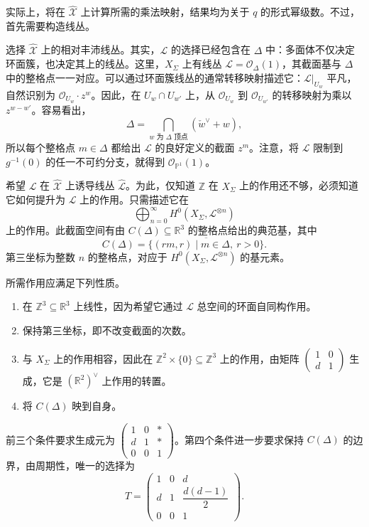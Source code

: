 实际上，将在 $\widehat{\mathcal X}$ 上计算所需的乘法映射，结果均为关于 $q$ 的形式幂级数。不过，首先需要构造线丛。

选择 $\widehat{\mathcal X}$ 上的相对丰沛线丛。其实，$\mathcal L$ 的选择已经包含在 $\Delta$ 中：多面体不仅决定环面簇，也决定其上的线丛。这里，$X_\Sigma$ 上有线丛 $\mathcal L=\mathcal O_\Delta(1)$，其截面基与 $\Delta$ 中的整格点一一对应。可以通过环面簇线丛的通常转移映射描述它：$\mathcal L|_{U_w}$ 平凡，自然识别为 $\mathcal O_{U_w}\cdot z^w$。因此，在 $U_w\cap U_{w'}$ 上，从 $\mathcal O_{U_w}$ 到 $\mathcal O_{U_{w'}}$ 的转移映射为乘以 $z^{w-w'}$。容易看出，
\[
\Delta=\bigcap_{w\text{ 为 }\Delta\text{ 顶点}}(\check w^\vee+w),
\]
所以每个整格点 $m\in\Delta$ 都给出 $\mathcal L$ 的良好定义的截面 $z^m$。注意，将 $\mathcal L$ 限制到 $g^{-1}(0)$ 的任一不可约分支，就得到 $\mathcal O_{\mathbb P^1}(1)$。

希望 $\mathcal L$ 在 $\widehat{\mathcal X}$ 上诱导线丛 $\widehat{\mathcal L}$。为此，仅知道 $\mathbb Z$ 在 $X_\Sigma$ 上的作用还不够，必须知道它如何提升为 $\mathcal L$ 上的作用。只需描述它在
\[
\bigoplus_{n=0}^\infty H^0(X_\Sigma,\mathcal L^{\otimes n})
\]
上的作用。此截面空间有由 $C(\Delta)\subseteq\mathbb R^3$ 的整格点给出的典范基，其中
\[
C(\Delta)=\overline{\{(rm,r)\mid m\in\Delta,\ r>0\}}.
\]
第三坐标为整数 $n$ 的整格点，对应于 $H^0(X_\Sigma,\mathcal L^{\otimes n})$ 的基元素。

所需作用应满足下列性质。
\begin{enumerate}
\item 在 $\mathbb Z^3\subseteq\mathbb R^3$ 上线性，因为希望它通过 $\mathcal L$ 总空间的环面自同构作用。
\item 保持第三坐标，即不改变截面的次数。
\item 与 $X_\Sigma$ 上的作用相容，因此在 $\mathbb Z^2\times\{0\}\subseteq\mathbb Z^3$ 上的作用，由矩阵 $\begin{pmatrix}1&0\\d&1\end{pmatrix}$ 生成，它是 $(\mathbb R^2)^\vee$ 上作用的转置。
\item 将 $C(\Delta)$ 映到自身。
\end{enumerate}
前三个条件要求生成元为 $\begin{pmatrix}1&0&*\\d&1&*\\0&0&1\end{pmatrix}$。第四个条件进一步要求保持 $C(\Delta)$ 的边界，由周期性，唯一的选择为
\[
T=\begin{pmatrix}
1&0&d\\
d&1&\dfrac{d(d-1)}2\\
0&0&1
\end{pmatrix}.
\]

